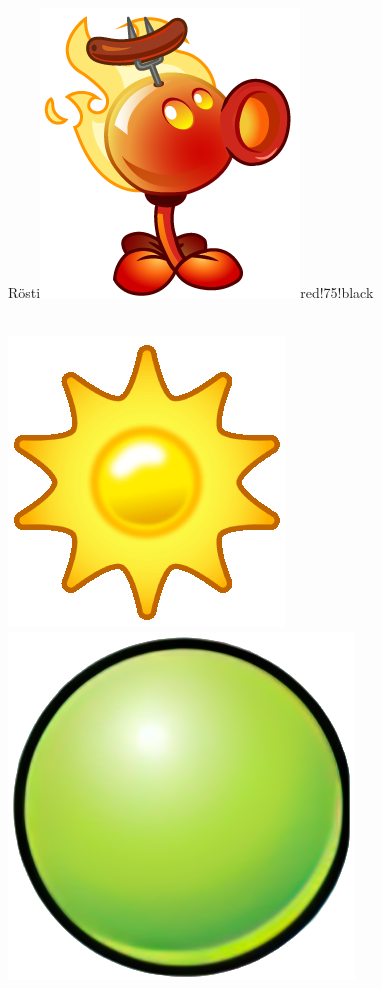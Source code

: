 \documentclass[11pt, a5paper]{article}
\def\now{\hspace{0.2cm}}
\begin{document}
	\begin{mybox}{Rösti}{\includegraphics[scale=0.1]{fire}}{red!75!black}
		\phantom{My}\\ \\
		\tcblower
		\begin{minipage}[t]{\textwidth}
			\vspace*{-1.2cm}
			\now\includegraphics[scale=0.1]{sun} 
			\now\includegraphics[scale=0.075]{peap} 

\end{minipage}
\end{mybox}
\end{document}
